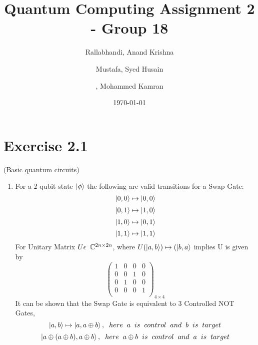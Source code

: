 \documentclass[a4paper,12pt]{article}
\title{Quantum Computing Assignment 2 - Group 18}
\author{
    Rallabhandi, Anand Krishna 
    \and
    Mustafa, Syed Husain
    \and
     , Mohammed Kamran 
}
\date{\today}
\begin{document}
\maketitle

\section*{Exercise 2.1}

 (Basic quantum circuits)

\begin{enumerate}[label=(\alph*)]
    \item
          For a 2 qubit state $\ket{\phi}$ the following are valid transitions for a Swap Gate:
          \[ \ket{0,0} \mapsto \ket{0,0}\]
          \[ \ket{0,1} \mapsto \ket{1,0}\]
          \[ \ket{1,0} \mapsto \ket{0,1}\]
          \[ \ket{1,1} \mapsto \ket{1,1}\]
          For Unitary Matrix $U \epsilon \hspace{2mm}\mathbb{C}^{2n \times 2n}$, where $U(\ket{a,b}) \mapsto (\ket{b,a}$ implies U is given by
          \[\begin{pmatrix}
                  1 & 0 & 0 & 0 \\
                  0 & 0 & 1 & 0 \\
                  0 & 1 & 0 & 0 \\
                  0 & 0 & 0 & 1 \\
              \end{pmatrix}_{4 \times 4}
          \]
          It can be shown that the Swap Gate is equivalent to 3 Controlled NOT Gates,\\
          \[\ket{a,b} \mapsto \ket{a, a\oplus b}, \hspace{2mm}here\hspace{2mm} a\hspace{2mm} is\hspace{2mm} control\hspace{2mm} and \hspace{2mm}b\hspace{2mm} is\hspace{2mm} target\]
          \[\ket{a\oplus (a\oplus b), a\oplus b}, \hspace{2mm}here\hspace{2mm} a\oplus b\hspace{2mm} is\hspace{2mm} control\hspace{2mm} and \hspace{2mm}a\hspace{2mm} is\hspace{2mm} target\]

\end{enumerate}
\end{document}
